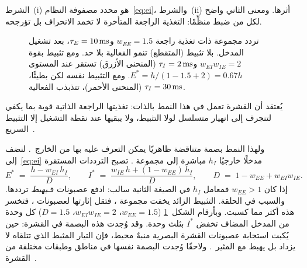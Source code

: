 الشرط~(i) هو محدد مصفوفة النظام~\eqref{eq:ei}، والشرط~(ii) أثرها. ومعنى الثاني واضح لكل من ضبط منظِّمًا: التغذية الراجعة المتأخرة لا تخمد الانحراف بل تؤرجحه.

\begin{figure}[t]
\centering
{}
\caption{تردد مجموعة  ذات تغذية راجعة $w_{EE}=1.5$ و$\tau_E=10\,\text{ms}$، بعد تشغيل المدخل. بلا تثبيط (المتقطع) تنمو الفعالية بلا حد. ومع تثبيط بقوة $w_{EI}w_{IE}=2$ و$\tau_I=2\,\text{ms}$ (المنحنى الأزرق) تستقر عند المستوى $E^*=h/(1-1.5+2)=0.67h$. ومع التثبيط نفسه لكن بطيئًا، $\tau_I=30\,\text{ms}$ (المنحنى الأحمر)، تتذبذب الفعالية.}
\label{fig:ei}
\end{figure}

يُعتقد أن القشرة تعمل في هذا النمط بالذات: تغذيتها الراجعة الذاتية قوية بما يكفي لتنجرف إلى انهيار متسلسل لولا التثبيط، ولا يبقيها عند نقطة التشغيل إلا التثبيط السريع~\cite{Tsodyks1997isn}.

ولهذا النمط بصمة متناقضة ظاهريًا يمكن التعرف عليه بها من الخارج~\cite{Tsodyks1997isn}. لنضف إلى~\eqref{eq:ei} مدخلًا خارجيًا $h_I$ مباشرة إلى مجموعة . تصبح الترددات المستقرة
\begin{equation}
E^* \;=\; \frac{h-w_{EI}\,h_I}{D},\qquad
I^* \;=\; \frac{w_{IE}\,h+(1-w_{EE})\,h_I}{D},\qquad
D \;=\; 1-w_{EE}+w_{EI}w_{IE} .
\label{eq:isn}
\end{equation}
إذا كان $w_{EE}>1$ فمعامل $h_I$ في الصيغة الثانية سالب: ادفع عصبونات  فـ\emph{يهبط} ترددها. والسبب في الحلقة. التثبيط الزائد يخفت مجموعة ، فتقل إثارتها لعصبونات ، فتخسر هذه أكثر مما كسبت. وبأرقام الشكل~\ref{fig:ei} ($w_{EE}=1.5$، $w_{EI}w_{IE}=2$، $D=1.5$) كل وحدة من المدخل المضاف تخفض $I^*$ بثلث وحدة. وقد وُجدت هذه البصمة في القشرة: حين يُكبت استجابة عصبونات القشرة البصرية منبهٌ محيط، فإن التيار المثبط الذي تتلقاه لا يزداد بل يهبط مع المثير~\cite{Ozeki2009}. ولاحقًا وُجدت البصمة نفسها في مناطق وطبقات مختلفة من القشرة~\cite{Sanzeni2020}.

